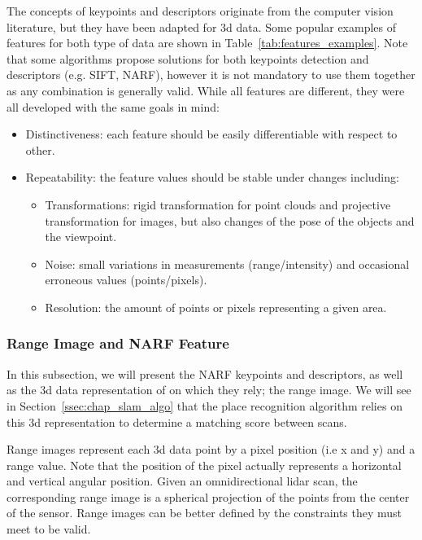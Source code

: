 The concepts of keypoints and descriptors originate from the computer vision literature, but they have been adapted for \gls*{3d} data. Some popular examples of features for both type of data are shown in Table~\ref{tab:features_examples}. Note that some algorithms propose solutions for both keypoints detection and descriptors (e.g. SIFT, NARF), however it is not mandatory to use them together as any combination is generally valid. While all features are different, they were all developed with the same goals in mind:
\begin{itemize}[label=$\bullet$,noitemsep,topsep=0pt]
    \item Distinctiveness: each feature should be easily differentiable with respect to other.
    \item Repeatability: the feature values should be stable under changes including:
        \begin{itemize}[label=$\circ$,noitemsep,topsep=0pt]
            \item Transformations: rigid transformation for point clouds and projective transformation for images, but also changes of the pose of the objects and the viewpoint.
            \item Noise: small variations in measurements (range/intensity) and occasional erroneous values (points/pixels).
            \item Resolution: the amount of points or pixels representing a given area.
        \end{itemize}
\end{itemize}


\subsubsection{Range Image and NARF Feature}
\label{ssub:NARF Features and Range Image}

In this subsection, we will present the NARF keypoints and descriptors, as well as the \gls*{3d} data representation of on which they rely; the range image. We will see in Section~\ref{ssec:chap_slam_algo} that the place recognition algorithm relies on this \gls*{3d} representation to determine a matching score between scans.

Range images represent each \gls*{3d} data point by a pixel position (i.e x and y) and a range value. Note that the position of the pixel actually represents a horizontal and vertical angular position. Given an omnidirectional \gls*{lidar} scan, the corresponding range image is a spherical projection of the points from the center of the sensor. Range images can be better defined by the constraints they must meet to be valid. 


